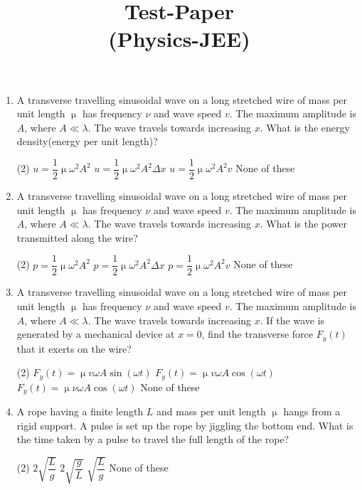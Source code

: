 \documentclass{article}
\title{Test-Paper\\(Physics-JEE)}
\begin{document}
\maketitle

\jeeSectionA
\begin{enumerate}
\item A transverse travelling sinusoidal wave on a long stretched wire of mass per unit length $\upmu$ has frequency $\nu$ and wave speed $v$. The maximum amplitude is $A$, where $A\ll\lambda$. The wave travels towards increasing $x$. What is the energy density(energy per unit length)?
	\begin{tasks}(2)
		\task $u=\dfrac{1}{2}\upmu \omega^2A^2$\ans
		\task $u=\dfrac{1}{2}\upmu \omega^2A^2 \Delta x$
		\task $u=\dfrac{1}{2}\upmu \omega^2 A^2 v$
		\task None of these
	\end{tasks}

\item A transverse travelling sinusoidal wave on a long stretched wire of mass per unit length $\upmu$ has frequency $\nu$ and wave speed $v$. The maximum amplitude is $A$, where $A\ll\lambda$. The wave travels towards increasing $x$. What is the power transmitted along the wire?
	\begin{tasks}(2)
		\task $p=\dfrac{1}{2}\upmu \omega^2A^2$
		\task $p=\dfrac{1}{2}\upmu \omega^2A^2 \Delta x$
		\task $p=\dfrac{1}{2}\upmu \omega^2 A^2 v$\ans
		\task None of these
	\end{tasks}

\item A transverse travelling sinusoidal wave on a long stretched wire of mass per unit length $\upmu$ has frequency $\nu$ and wave speed $v$. The maximum amplitude is $A$, where $A\ll\lambda$. The wave travels towards increasing $x$. If the wave is generated by a mechanical device at $x=0$, find the transverse force $F_y(t)$ that it exerts on the wire?
	\begin{tasks}(2)
		\task $F_y(t)=\upmu v \omega A \sin(\omega t)$
		\task $F_y(t)=\upmu v \omega A \cos(\omega t)$\ans
		\task $F_y(t)=\upmu \nu \omega A \cos(\omega t)$
		\task None of these
	\end{tasks}


\item  A rope having a finite length $L$ and mass per unit length $\upmu$ hangs from a rigid support. A pulse is set up the rope by jiggling the bottom end. What is the time taken by a pulse to travel the full length of the rope?
	\begin{center}
	\end{center}
	\begin{tasks}(2)
		\task $2\sqrt{\dfrac{L}{g}}$\ans
		\task $2\sqrt{\dfrac{g}{L}}$	
		\task $\sqrt{\dfrac{L}{g}}$
		\task None of these
	\end{tasks}


\end{enumerate}
\end{document}
